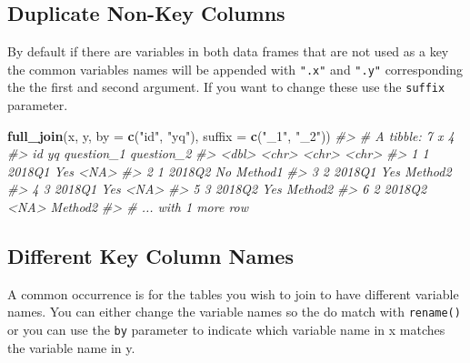 \documentclass[]{book}
\newenvironment{Shaded}{\begin{snugshade}}{\end{snugshade}}
\newcommand{\CommentTok}[1]{\textcolor[rgb]{0.56,0.35,0.01}{\textit{#1}}}
\newcommand{\DataTypeTok}[1]{\textcolor[rgb]{0.13,0.29,0.53}{#1}}
\newcommand{\KeywordTok}[1]{\textcolor[rgb]{0.13,0.29,0.53}{\textbf{#1}}}
\newcommand{\NormalTok}[1]{#1}
\newcommand{\StringTok}[1]{\textcolor[rgb]{0.31,0.60,0.02}{#1}}
\theoremstyle{definition}
\theoremstyle{definition}
\theoremstyle{definition}
\theoremstyle{remark}
\begin{document}
\hypertarget{duplicate-non-key-columns}{%
\subsection{Duplicate Non-Key Columns}\label{duplicate-non-key-columns}}

By default if there are variables in both data frames that are not used
as a key the common variables names will be appended with \texttt{".x"}
and \texttt{".y"} corresponding the the first and second argument. If
you want to change these use the \texttt{suffix} parameter.

\begin{Shaded}
\begin{Highlighting}[]
\KeywordTok{full_join}\NormalTok{(x, y, }\DataTypeTok{by =} \KeywordTok{c}\NormalTok{(}\StringTok{"id"}\NormalTok{, }\StringTok{"yq"}\NormalTok{), }\DataTypeTok{suffix =} \KeywordTok{c}\NormalTok{(}\StringTok{"_1"}\NormalTok{, }\StringTok{"_2"}\NormalTok{))}
\CommentTok{#> # A tibble: 7 x 4}
\CommentTok{#>      id yq     question_1 question_2}
\CommentTok{#>   <dbl> <chr>  <chr>      <chr>     }
\CommentTok{#> 1     1 2018Q1 Yes        <NA>      }
\CommentTok{#> 2     1 2018Q2 No         Method1   }
\CommentTok{#> 3     2 2018Q1 Yes        Method2   }
\CommentTok{#> 4     3 2018Q1 Yes        <NA>      }
\CommentTok{#> 5     3 2018Q2 Yes        Method2   }
\CommentTok{#> 6     2 2018Q2 <NA>       Method2   }
\CommentTok{#> # ... with 1 more row}
\end{Highlighting}
\end{Shaded}

\hypertarget{different-key-column-names}{%
\subsection{Different Key Column
Names}\label{different-key-column-names}}

A common occurrence is for the tables you wish to join to have different
variable names. You can either change the variable names so the do match
with \texttt{rename()} or you can use the \texttt{by} parameter to
indicate which variable name in x matches the variable name in y.
\end{document}

